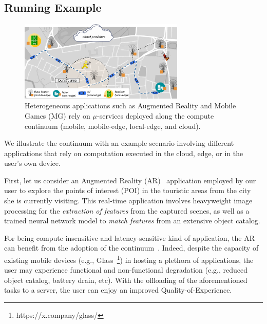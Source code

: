 
\subsection{Running Example}
\label{sub:example}

\begin{figure}[tbp]
	\includegraphics[width=0.7\textwidth]{figs/Continuum-Scenario}
	\setlength{\belowcaptionskip}{-10pt}
	\caption{Heterogeneous applications such as Augmented Reality and Mobile Games (MG) rely on $\mu$-services deployed along the compute continuum (mobile, mobile-edge, local-edge, and cloud).}
	\label{fig:continuum-scenario}
\end{figure}


We illustrate the continuum with an example scenario involving different applications that rely on computation executed in the cloud, edge, or in the user's own device.

First, let us consider an Augmented Reality (AR)~\cite{GarrigaMendonca2017} application employed by our user to 
explore the points of interest (POI) in the touristic areas from the city she is currently visiting.
This real-time application involves heavyweight image processing for the \textit{extraction of features} from the captured scenes, as well as a trained neural network model to \textit{match features} from an extensive object catalog. 

For being compute insensitive and latency-sensitive kind of application, the AR can benefit from the adoption of the continuum~\cite{beck2014mobile}. Indeed, despite the capacity of existing mobile devices (e.g., Glass~\footnote{https://x.company/glass/}) in hosting a plethora of applications, the user may experience functional and non-functional degradation (e.g., reduced object catalog, battery drain, etc). With the offloading of the aforementioned tasks to a server, the user can enjoy an improved Quality-of-Experience.

